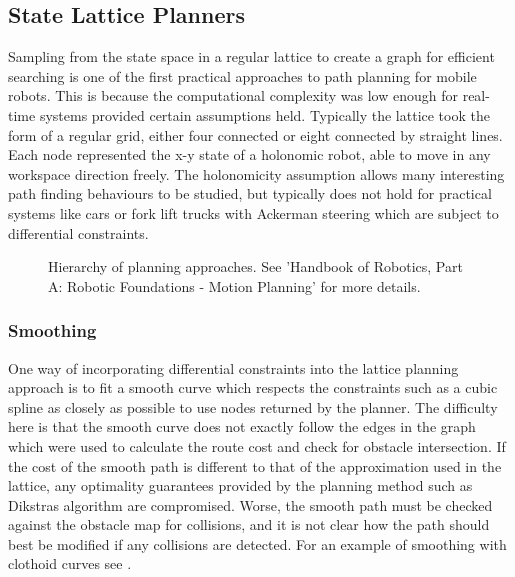 \subsection{State Lattice Planners}
\label{sec:state_lattice_planners}
Sampling from the state space in a regular lattice to create a graph for efficient searching is one of the first practical approaches to path planning for mobile robots. This is because the computational complexity was low enough for real-time systems provided certain assumptions held. Typically the lattice took the form of a regular grid, either four connected or eight connected by straight lines. Each node represented the x-y state of a holonomic robot, able to move in any workspace direction freely. The holonomicity assumption allows many interesting path finding behaviours to be studied, but typically does not hold for practical systems like cars or fork lift trucks with Ackerman steering which are subject to differential constraints.

\begin{figure}
\centering
\def\svgwidth{1.0\columnwidth}

\caption{Hierarchy of planning approaches. See 'Handbook of Robotics, Part A: Robotic Foundations - Motion Planning' \cite{SicilianoKhatib2016} for more details.}
\end{figure}

\subsubsection{Smoothing}
One way of incorporating differential constraints into the lattice planning approach is to fit a smooth curve which respects the constraints such as a cubic spline as closely as possible to use nodes returned by the planner. The difficulty here is that the smooth curve does not exactly follow the edges in the graph which were used to calculate the route cost and check for obstacle intersection. If the cost of the smooth path is different to that of the approximation used in the lattice, any optimality guarantees provided by the planning method such as Dikstras algorithm are compromised. Worse, the smooth path must be checked against the obstacle map for collisions, and it is not clear how the path should best be modified if any collisions are detected. For an example of smoothing with clothoid curves see \cite{Lundberg2017} \cite{Walton2005}.

